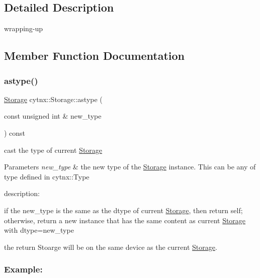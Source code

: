 \subsection{Detailed Description}
wrapping-\/up 

\subsection{Member Function Documentation}
\mbox{\label{classcytnx_1_1Storage_a8310d8dbb70510272ded2e3d01be25f0}} 
\subsubsection{\texorpdfstring{astype()}{astype()}}
{\footnotesize\ttfamily \hyperlink{classcytnx_1_1Storage}{Storage} cytnx\+::\+Storage\+::astype (\begin{DoxyParamCaption}\item[{const unsigned int \&}]{new\+\_\+type }\end{DoxyParamCaption}) const\hspace{0.3cm}{\ttfamily [inline]}}



cast the type of current \hyperlink{classcytnx_1_1Storage}{Storage} 


\begin{DoxyParams}{Parameters}
{\em new\+\_\+type} & the new type of the \hyperlink{classcytnx_1_1Storage}{Storage} instance. This can be any of type defined in cytnx\+::\+Type\\
\hline
\end{DoxyParams}
description\+:
\begin{DoxyEnumerate}
\item if the new\+\_\+type is the same as the dtype of current \hyperlink{classcytnx_1_1Storage}{Storage}, then return self; otherwise, return a new instance that has the same content as current \hyperlink{classcytnx_1_1Storage}{Storage} with dtype=new\+\_\+type
\item the return Stoarge will be on the same device as the current \hyperlink{classcytnx_1_1Storage}{Storage}.
\end{DoxyEnumerate}

\subsubsection*{Example\+:}

